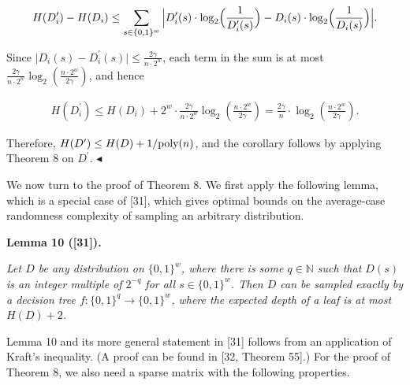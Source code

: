 \[\begin{gathered}
H(D^{\prime}_{i})-H(D_{i})\leq\sum_{s\in\{0,1\}^{w}}\Big\lvert D^{\prime}_{i}(s)\cdot\log_{2}\Bigl(\frac{1}{D^{\prime}_{i}(s)}\Bigr)-D_{i}(s)\cdot\log_{2}\Bigl(\frac{1}{D_{i}(s)}\Bigr)\Big\rvert.
\end{gathered}\]


Since $\lvert D_{i}(s)-D^{\prime}_{i}(s)\rvert\leq\frac{2\gamma}{n\cdot 2^{w}}$, each term in the sum is at most $\frac{2\gamma}{n\cdot 2^{w}}\log_{2}\left(\frac{n\cdot 2^{w}}{2\gamma}\right)$, and hence\par


\[\begin{gathered}
H(D^{\prime}_{i})\leq H(D_{i})+2^{w}\cdot\frac{2\gamma}{n\cdot 2^{w}}\log_{2}\left(\frac{n\cdot 2^{w}}{2\gamma}\right)=\frac{2\gamma}{n}\cdot\log_{2}\left(\frac{n\cdot 2^{w}}{2\gamma}\right).
\end{gathered}\]


Therefore, $H(D^{\prime})\leq H(D)+1/\textnormal{poly}(n)$, and the corollary follows by applying Theorem 8 on $D^{\prime}$.
$\blacktriangleleft$\par




We now turn to the proof of Theorem 8.
We first apply the following lemma, which is a special case of [31], which gives optimal bounds on the average-case randomness complexity of sampling an arbitrary distribution.\par





\par\medskip\noindent\textbf{
\textbf{Lemma 10}\textbf{ }([31])\textbf{.}
}\par



\emph{Let $D$ be any distribution on $\{0,1\}^{w}$, where there is some $q\in\mathbb{N}$ such that $D(s)$ is an integer multiple of $2^{-q}$ for all $s\in\{0,1\}^{w}$.
Then $D$ can be sampled exactly by a decision tree $f\colon\{0,1\}^{q}\to\{0,1\}^{w}$, where the expected depth of a leaf is at most $H(D)+2$.}\par






Lemma 10 and its more general statement in [31] follows from an application of Kraft’s inequality. (A proof can be found in [32, Theorem 55].)
For the proof of Theorem 8, we also need a sparse matrix with the following properties.\par



